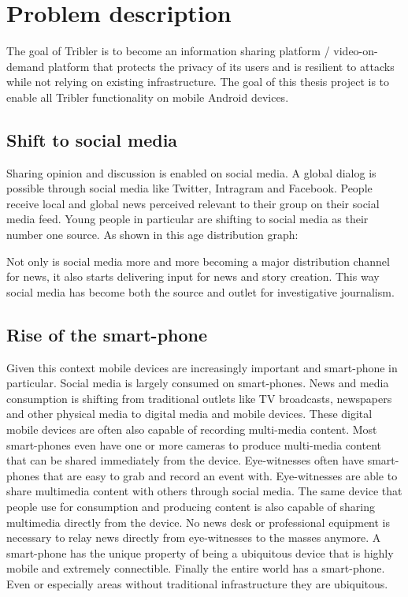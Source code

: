 \chapter{Problem description}

The goal of Tribler is to become an information sharing platform / video-on-demand platform that protects the privacy of its users and is resilient to attacks while not relying on existing infrastructure.
The goal of this thesis project is to enable all Tribler functionality on mobile Android devices.


\section{Shift to social media}
Sharing opinion and discussion is enabled on social media.
A global dialog is possible through social media like Twitter, Intragram and Facebook.
People receive local and global news perceived relevant to their group on their social media feed.
Young people in particular are shifting to social media as their number one source. \cite{reuters_social_media}
As shown in this age distribution graph:

Not only is social media more and more becoming a major distribution channel for news, it also starts delivering input for news and story creation.
This way social media has become both the source and outlet for investigative journalism.


\section{Rise of the smart-phone}
Given this context mobile devices are increasingly important and smart-phone in particular.
Social media is largely consumed on smart-phones.
News and media consumption is shifting from traditional outlets like TV broadcasts, newspapers and other physical media to digital media and mobile devices.
These digital mobile devices are often also capable of recording multi-media content.
Most smart-phones even have one or more cameras to produce multi-media content that can be shared immediately from the device.
Eye-witnesses often have smart-phones that are easy to grab and record an event with.
Eye-witnesses are able to share multimedia content with others through social media.
The same device that people use for consumption and producing content is also capable of sharing multimedia directly from the device.
No news desk or professional equipment is necessary to relay news directly from eye-witnesses to the masses anymore.
A smart-phone has the unique property of being a ubiquitous device that is highly mobile and extremely connectible.
Finally the entire world has a smart-phone.
Even or especially areas without traditional infrastructure they are ubiquitous.

